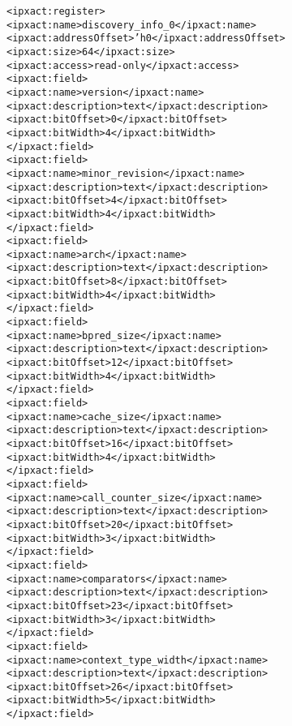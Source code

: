 \begin{alltt}
            <ipxact:register>
               <ipxact:name>discovery_info_0</ipxact:name>
               <ipxact:addressOffset>'h0</ipxact:addressOffset>
               <ipxact:size>64</ipxact:size>
               <ipxact:access>read-only</ipxact:access>
               <ipxact:field>
                  <ipxact:name>version</ipxact:name>
                  <ipxact:description>text</ipxact:description>
                  <ipxact:bitOffset>0</ipxact:bitOffset>
                  <ipxact:bitWidth>4</ipxact:bitWidth>
               </ipxact:field>
               <ipxact:field>
                  <ipxact:name>minor_revision</ipxact:name>
                  <ipxact:description>text</ipxact:description>
                  <ipxact:bitOffset>4</ipxact:bitOffset>
                  <ipxact:bitWidth>4</ipxact:bitWidth>
               </ipxact:field>
               <ipxact:field>
                  <ipxact:name>arch</ipxact:name>
                  <ipxact:description>text</ipxact:description>
                  <ipxact:bitOffset>8</ipxact:bitOffset>
                  <ipxact:bitWidth>4</ipxact:bitWidth>
               </ipxact:field>
               <ipxact:field>
                  <ipxact:name>bpred_size</ipxact:name>
                  <ipxact:description>text</ipxact:description>
                  <ipxact:bitOffset>12</ipxact:bitOffset>
                  <ipxact:bitWidth>4</ipxact:bitWidth>
               </ipxact:field>
               <ipxact:field>
                  <ipxact:name>cache_size</ipxact:name>
                  <ipxact:description>text</ipxact:description>
                  <ipxact:bitOffset>16</ipxact:bitOffset>
                  <ipxact:bitWidth>4</ipxact:bitWidth>
               </ipxact:field>
               <ipxact:field>
                  <ipxact:name>call_counter_size</ipxact:name>
                  <ipxact:description>text</ipxact:description>
                  <ipxact:bitOffset>20</ipxact:bitOffset>
                  <ipxact:bitWidth>3</ipxact:bitWidth>
               </ipxact:field>
               <ipxact:field>
                  <ipxact:name>comparators</ipxact:name>
                  <ipxact:description>text</ipxact:description>
                  <ipxact:bitOffset>23</ipxact:bitOffset>
                  <ipxact:bitWidth>3</ipxact:bitWidth>
               </ipxact:field>
               <ipxact:field>
                  <ipxact:name>context_type_width</ipxact:name>
                  <ipxact:description>text</ipxact:description>
                  <ipxact:bitOffset>26</ipxact:bitOffset>
                  <ipxact:bitWidth>5</ipxact:bitWidth>
               </ipxact:field>

\end{alltt}
